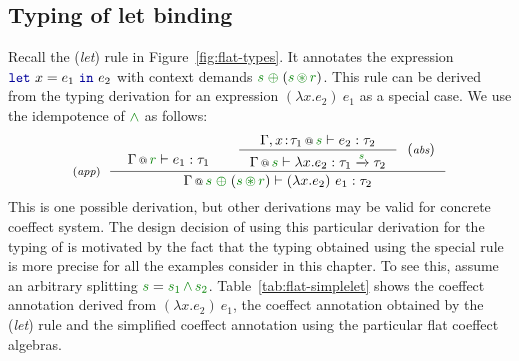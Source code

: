 
\subsection{Typing of let binding}
\label{sec:flat-exts-let}

Recall the (\emph{let}) rule in Figure~\ref{fig:flat-types}. It annotates the expression
$\kvd{let}~x=e_1~\kvd{in}~e_2$ with context demands $\cclrd{s}\;\cpar\;(\cclrd{s}\,\cseq\,\cclrd{r})$.
This rule can be derived from the typing derivation for an expression $(\lambda x.e_2)~e_1$ as
a special case. We use the idempotence of $\czip$ as follows:
%
\begin{equation*}
\tyrule{app}
  {\begin{array}{l}
   \vspace{-1.5em}
   \coctx{\Gamma}{\cclrd{r}} \vdash e_1 : \tau_1
   \end{array} &
   \tyruler{abs}
       { \coctx{\Gamma, x\!:\!\tau_1}{\cclrd{s}} \vdash e_2 : \tau_2 }
       { \coctx{\Gamma}{\cclrd{s}} \vdash \lambda x.e_2 : \tau_1 \xrightarrow{\cclrd{s}} \tau_2 } }
  { \coctx{\Gamma}{\cclrd{s}\;\cpar\;(\cclrd{s}\,\cseq\,\cclrd{r})} \vdash (\lambda x.e_2)~e_1 : \tau_2 }
\end{equation*}
%
This is one possible derivation, but other derivations may be valid for concrete coeffect system.
The design decision of using this particular derivation for the typing of  is motivated by
the fact that the typing obtained using the special rule is more precise for all the examples
consider in this chapter. To see this, assume an arbitrary splitting
$\cclrd{s} = \cclrd{s_1}\,\czip\,\cclrd{s_2}$. Table~\ref{tab:flat-simplelet}
shows the coeffect annotation derived from $(\lambda x.e_2)~e_1$, the coeffect annotation obtained
by the (\emph{let}) rule and the simplified coeffect annotation using the particular flat coeffect
algebras.

